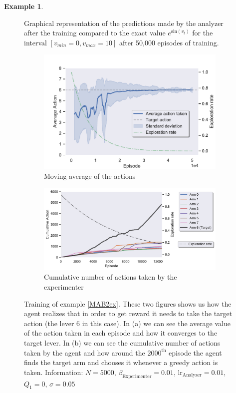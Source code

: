 \documentclass[11pt,a4paper,twoside]{report}
\newcommand{\+}{\textnormal{+} }
\theoremstyle{definition}
\newtheorem{myex}[mythm]{Example}
\numberwithin{equation}{chapter}
\begin{document}
\begin{myex}
\begin{figure}
      \caption{Graphical representation of the predictions made by the analyzer
      after the training compared to the exact value $e^{\text{sin}(v_t)}$ for 
      the interval $[v_{min}=0,v_{max}=10]$ after 50,000 episodes of training.}
      \label{performanceMBA2}
    \end{figure}


    \begin{figure}[]
      \centering
      \begin{subfigure}{.5\textwidth}
        \centering
        \includegraphics[width=1\linewidth]{figures/Actions-MAB2.pdf}
        \caption{Moving average of the actions}
        \label{fig:ActionAverageMAB2}
      \end{subfigure}%
      \begin{subfigure}{.5\textwidth}
        \centering
        \includegraphics[width=1\linewidth]{figures/Cum-action-MAB2.pdf}
        \caption{Cumulative number of actions taken by the experimenter}
        \label{fig:actionsMAB2}
      \end{subfigure}
      \caption{Training of example \ref{MAB2ex}. These two figures shows us how
      the agent realizes that in order to get reward it needs to take the target
      action (the lever 6 in this case). In (a) we can see the average value of
      the action taken in each episode and how it converges to the target lever.
      In (b) we can see the cumulative number of actions taken by the agent and
      how around the $2000^\text{th}$ episode the agent finds the target arm and
      chooses it whenever a greedy action is taken. Information: $N=5000$,
      $\beta_\text{Experimenter}=0.01$, $\text{lr}_\text{Analyzer}=0.01$,
      $Q_1=0$, $\sigma=0.05$}
    \end{figure}


\end{myex}
\end{document}
